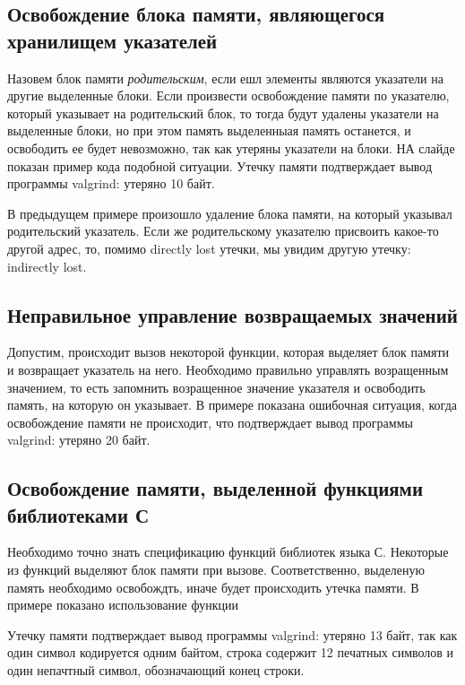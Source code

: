 \documentclass[10pt]{article}
\begin{document}
\subsection{Освобождение блока памяти, являющегося хранилищем указателей}
Назовем блок памяти {\it родительским}, если ешл элементы
являются указатели на другие выделенные блоки. Если произвести освобождение памяти по указателю,
который указывает на родительский блок, то тогда будут удалены указатели на выделенные блоки,
но при этом память выделенныая память останется, и освободить ее будет невозможно, так как утеряны
указатели на блоки. НА слайде показан пример кода подобной ситуации. Утечку памяти подтверждает
вывод программы valgrind: утеряно 10 байт.

В предыдущем примере произошло удаление блока памяти, на который указывал
родительский указатель. Если же родительскому указателю присвоить какое-то другой 
адрес, то, помимо directly lost утечки, мы увидим другую утечку: indirectly lost.

\subsection{Неправильное управление возвращаемых значений}
Допустим, происходит вызов некоторой функции, которая выделяет блок памяти
и возвращает указатель на него. Необходимо правильно управлять возращенным значением,
то есть запомнить возращенное значение указателя и освободить память, на которую он указывает.
В примере показана ошибочная ситуация, когда освобождение памяти не происходит, что подтверждает
вывод программы valgrind: утеряно 20 байт.

\subsection{Освобождение памяти, выделенной функциями библиотеками С}
Необходимо точно знать спецификацию функций библиотек языка С. Некоторые из функций
выделяют блок памяти при вызове. Соответственно, выделеную память необходимо освобождть, иначе будет происходить
утечка памяти. В примере показано использование функции

Утечку памяти подтверждает вывод программы valgrind: утеряно 13 байт, так как один символ кодируется одним байтом,
строка содержит 12 печатных символов и один непачтный символ, обозначающий конец строки.
\end{document}
